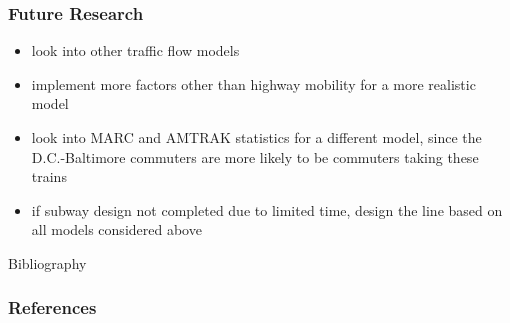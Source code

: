 \documentclass[compress,handout,10pt]{beamer}
\let\olditem\item
\renewcommand{\item}{\setlength{\itemsep}{0.5\baselineskip}\olditem}
\begin{document}
\begin{frame}
    \frametitle{Future Research}
	\begin{itemize}
	\item look into other traffic flow models
	\item implement more factors other than highway mobility for a more realistic model
	\item look into MARC and AMTRAK statistics for a different model, since the D.C.-Baltimore commuters are more likely to be commuters taking these trains
	\item if subway design not completed due to limited time, design the line based on all models considered above
	\end{itemize}
\end{frame}

\begin{frame}[allowframebreaks]{Bibliography}
\frametitle{References}

\nocite{*}

\end{frame}
\end{document}
